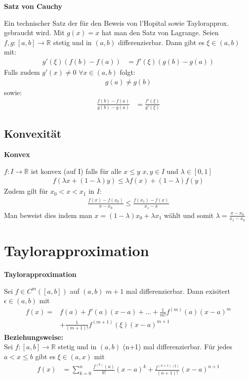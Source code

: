 \documentclass[25pt]{sciposter}
\newcommand{\R}{\mathbb{R}}
\newenvironment{method}[1]{\begin{mdframed}[backgroundcolor=blue!10,innertopmargin=15pt, innerbottommargin=15pt, nobreak=true]
		\textbf{#1 }
	}
	{ 
	\end{mdframed}
}
\begin{document}
\begin{multicols}{3}
\begin{method}{Satz von Cauchy}
	Ein technischer Satz der für den Beweis von l'Hopital sowie Taylorapprox. gebraucht wird. Mit $g(x)=x$ hat man den Satz von Lagrange. \newline
Seien $f,g:[a,b]\to \R$ stetig und in $(a,b)$ differenzierbar. Dann gibt es $\xi \in (a,b)$ mit:
\begin{align*}
	g'(\xi)(f(b)-f(a)) &= f'(\xi)(g(b) - g(a))
\end{align*}
Falls zudem $g'(x) \not = 0$ $\forall x \in (a,b)$ folgt:
\begin{align*}
	g(a) \not = g(b)
\end{align*}
sowie:
\begin{align*}
	\frac{f(b) - f(a)}{g(b) - g(a)} &= \frac{f'(\xi)}{g'(\xi)}
\end{align*}
\end{method}


\subsection*{Konvexität}

\begin{method}{Konvex}
	$f : I \to \R$ ist konvex (auf I) falls für alle $x \leq y$ $x,y \in I$ und $\lambda \in [0,1]$
	\begin{align*}
	f(\lambda x + (1-\lambda)y) \leq \lambda f(x) + (1-\lambda)f(y)
	\end{align*}
	Zudem gilt für $x_0 < x< x_1$ in $I$:
	\begin{align*}
	 \frac{f(x) - f(x_0)}{x-x_0} \leq \frac{f(x_1) - f(x)}{x_1 - x}
	\end{align*}
	Man beweist dies indem man $x = (1-\lambda) x_0 + \lambda x_1$ wählt und somit $\lambda = \frac{x-x_0}{x_1 - x_0}$
\end{method}

\section*{Taylorapproximation}

\begin{method}{Taylorapproximation}
Sei $f\in C^m ([a,b])$ auf $(a,b)$ $m+1$ mal differenzierbar. Dann exisitert $\epsilon \in (a,b)$ mit 
\begin{align*}
	f(x) =& f(a) + f'(a)(x-a) + \ldots + \frac{1}{m!} f^{(m)} (a) (x-a)^m\\ &+ \frac{1}{(m+1)!} f^{(m+1)}(\xi) (x-a)^{m+1}
\end{align*} 
 \textbf{Beziehungsweise:}\\
	Sei $f:[a,b] \to \R$ stetig und in $(a,b)$ (n+1) mal differenzierbar. Für jedes $a<x\leq b$ gibt es $\xi \in (a,x)$ mit
	\begin{align*}
	f(x) &= \sum_{k=0}^n \frac{f^{(k)}(a)}{k!} (x-a)^k + \frac{f^{(n+1)(\xi)}}{(n+1)!} (x-a)^{n+1}
	\end{align*}


\end{method}
\end{multicols}
\end{document}
